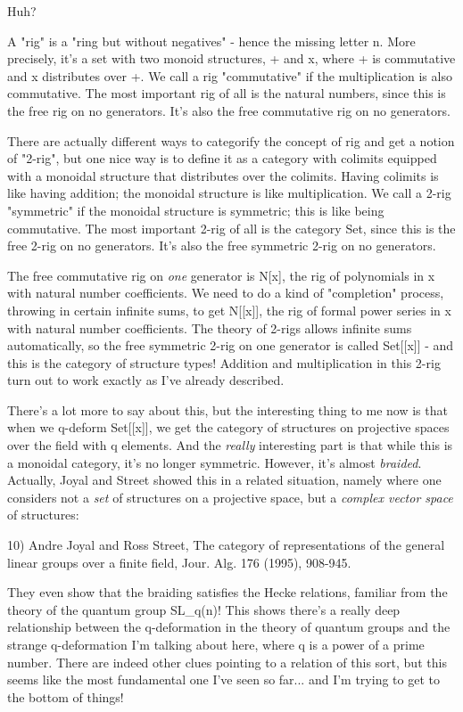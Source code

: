 Huh?

A "rig" is a "ring but without negatives" - hence the missing letter n.
More precisely, it's a set with two monoid structures, + and x, where +
is commutative and x distributes over +.   We call a rig "commutative" 
if the multiplication is also commutative.  The most important rig of all
is the natural numbers, since this is the free rig on no generators.
It's also the free commutative rig on no generators.

There are actually different ways to categorify the concept of rig and
get a notion of "2-rig", but one nice way is to define it as a category
with colimits equipped with a monoidal structure that distributes over
the colimits.  Having colimits is like having addition; the monoidal
structure is like multiplication.  We call a 2-rig "symmetric" if the
monoidal structure is symmetric; this is like being commutative.  The
most important 2-rig of all is the category Set, since this is the free
2-rig on no generators.  It's also the free symmetric 2-rig on no
generators.

The free commutative rig on \emph{one} generator is N[x], the rig of 
polynomials in x with natural number coefficients.  We need to do a 
kind of "completion" process, throwing in certain infinite sums, to
get N[[x]], the rig of formal power series in x with natural number
coefficients.  The theory of 2-rigs allows infinite sums automatically,
so the free symmetric 2-rig on one generator is called Set[[x]] - and
this is the category of structure types!  Addition and multiplication
in this 2-rig turn out to work exactly as I've already described.  

There's a lot more to say about this, but the interesting thing to me
now is that when we q-deform Set[[x]], we get the category of structures
on projective spaces over the field with q elements.  And the \emph{really}
interesting part is that while this is a monoidal category, it's no
longer symmetric.  However, it's almost \emph{braided}.  Actually,
Joyal and Street showed this in a related situation, namely where one
considers not a \emph{set} of structures on a projective space, but a
\emph{complex vector space} of structures:

10) Andre Joyal and Ross Street, The category of representations of
the general linear groups over a finite field, Jour. Alg. 176 (1995),
908-945.

They even show that the braiding satisfies the Hecke relations, familiar
from the theory of the quantum group SL_{q}(n)!  This shows there's a
really deep relationship between the q-deformation in the theory of
quantum groups and the strange q-deformation I'm talking about here,
where q is a power of a prime number.  There are indeed other clues
pointing to a relation of this sort, but this seems like the most
fundamental one I've seen so far... and I'm trying to get to the 
bottom of things!  

